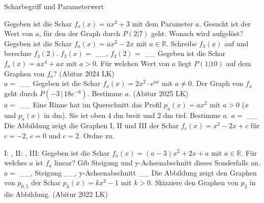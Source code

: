 \setcounter{aufgabe}{9}

\begin{aufgabe}{Scharbegriff und Parameterwert}
\begin{teile}
\teil Gegeben ist die Schar $f_a(x) = a x^2 + 3$ mit dem Parameter $a$. Gesucht ist der Wert von $a$, für den der Graph durch $P(2 | 7)$ geht. Wonach wird aufgelöst? \\  
\teil Gegeben ist die Schar $f_a(x) = a x^2 - 2x$ mit $a \in \mathbb{R}$. Schreibe $f_3(x)$ auf und berechne $f_3(2)$. $f_3(x) =$ \_\_, $f_3(2) =$ \_\_
\teil Gegeben ist die Schar $f_a(x) = a x^4 + a x$ mit $a > 0$. Für welchen Wert von $a$ liegt $P(1 | 10)$ auf dem Graphen von $f_a$? \hfill (Abitur 2024 LK) \\ $a =$ \_\_
\teil Gegeben ist die Schar $f_a(x) = 2x^2 \cdot e^{a x}$ mit $a \neq 0$. Der Graph von $f_a$ geht durch $P(-3 \,|\, 18e^{-6})$. Bestimme $a$. \hfill (Abitur 2025 LK) \\ $a =$ \_\_
\teil Eine Rinne hat im Querschnitt das Profil $p_a(x) = a x^2$ mit $a > 0$ ($x$ und $p_a(x)$ in dm). Sie ist oben 4 dm breit und 2 dm tief. Bestimme $a$. $a =$ \_\_
\teil Die Abbildung zeigt die Graphen I, II und III der Schar $f_c(x) = x^2 - 2x + c$ für $c = -2$, $c = 0$ und $c = 2$. Ordne zu.

\begin{ksys}[xmin=-2,xmax=4,ymin=-4,ymax=6,ablesen]    \end{ksys}
I: \leerfeld , II: \leerfeld , III: \leerfeld
\teil Gegeben ist die Schar $f_a(x) = (a - 3)x^2 + 2x + a$ mit $a \in \mathbb{R}$. Für welches $a$ ist $f_a$ linear? Gib Steigung und y-Achsenabschnitt dieses Sonderfalls an. $a =$ \_\_, Steigung \_\_, y-Achsenabschnitt \_\_
\teil Die Abbildung zeigt den Graphen von $p_{0{,}5}$ der Schar $p_k(x) = k x^2 - 1$ mit $k > 0$. Skizziere den Graphen von $p_2$ in die Abbildung. \hfill (Abitur 2022 LK)


\end{teile}
\end{aufgabe}
